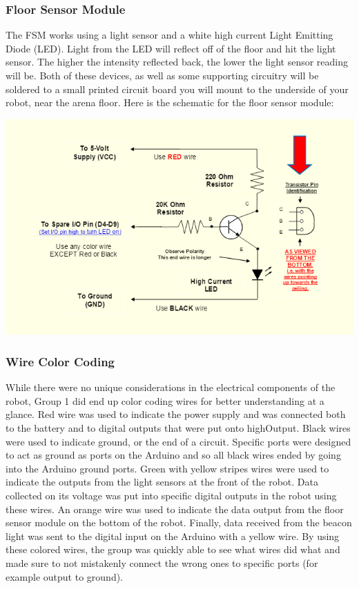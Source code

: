 \documentclass{article}
\begin{document}
    \subsubsection{Floor Sensor Module}
     The FSM works using a light sensor and a white high current Light Emitting Diode (LED).  Light from the LED will reflect off of the floor and hit the light sensor. The higher the intensity reflected back, the lower the light sensor reading will be. Both of these devices, as well as some supporting circuitry will be soldered to a small printed circuit board you will mount to the underside of your robot, near the arena floor. Here is the schematic for the floor sensor module: 
     
     \begin{center}
     \includegraphics[width=\textwidth]{FSMSchematic.png}
     \end{center}
     
    \subsubsection{Wire Color Coding}
    While there were no unique considerations in the electrical components of the robot, Group 1 did end up color coding wires for better understanding at a glance. Red wire was used to indicate the power supply and was connected both to the battery and to digital outputs that were put onto highOutput. Black wires were used to indicate ground, or the end of a circuit. Specific ports were designed to act as ground as ports on the Arduino and so all black wires ended by going into the Arduino ground ports. Green with yellow stripes wires were used to indicate the outputs from the light sensors at the front of the robot. Data collected on its voltage was put into specific digital outputs in the robot using these wires. An orange wire was used to indicate the data output from the floor sensor module on the bottom of the robot. Finally, data received from the beacon light was sent to the digital input on the Arduino with a yellow wire. By using these colored wires, the group was quickly able to see what wires did what and made sure to not mistakenly connect the wrong ones to specific ports (for example output to ground). 
\end{document}
